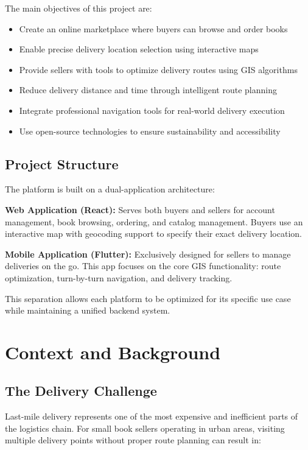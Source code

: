 \documentclass[12pt,a4paper]{article}
\begin{document}
The main objectives of this project are:

\begin{itemize}
    \item Create an online marketplace where buyers can browse and order books
    \item Enable precise delivery location selection using interactive maps
    \item Provide sellers with tools to optimize delivery routes using GIS algorithms
    \item Reduce delivery distance and time through intelligent route planning
    \item Integrate professional navigation tools for real-world delivery execution
    \item Use open-source technologies to ensure sustainability and accessibility
\end{itemize}

\subsection{Project Structure}

The platform is built on a dual-application architecture:

\textbf{Web Application (React):} Serves both buyers and sellers for account management, book browsing, ordering, and catalog management. Buyers use an interactive map with geocoding support to specify their exact delivery location.

\textbf{Mobile Application (Flutter):} Exclusively designed for sellers to manage deliveries on the go. This app focuses on the core GIS functionality: route optimization, turn-by-turn navigation, and delivery tracking.

This separation allows each platform to be optimized for its specific use case while maintaining a unified backend system.

\newpage

\section{Context and Background}

\subsection{The Delivery Challenge}

Last-mile delivery represents one of the most expensive and inefficient parts of the logistics chain. For small book sellers operating in urban areas, visiting multiple delivery points without proper route planning can result in:
\end{document}
